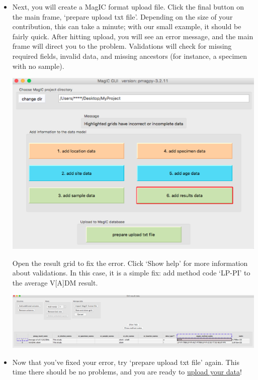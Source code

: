 \documentclass[11pt]{book}
\begin{document}
{\begin{itemize}
  \item Next, you will create a MagIC format upload file.  Click the final button on the main frame, `prepare upload txt file'.  Depending on the size of your contribution, this can take a minute; with our small example, it should be fairly quick.  After hitting upload, you will see an error message, and the main frame will direct you to the problem.  Validations will check for missing required fields, invalid data, and missing ancestors (for instance, a specimen with no sample).

    \includegraphics[width=25cm]{EPSfiles/MM_validation_mainframe.eps}

    Open the result grid to fix the error.  Click `Show help' for more information about validations.  In this case, it is a simple fix: add method code `LP-PI' to the average V[A]DM result.

    \includegraphics[width=45cm]{EPSfiles/MM_filled_in_result_validation.eps}

  \item Now that you've fixed your error, try `prepare upload txt file' again.  This time there should be no problems, and you are ready to \href{#magic_upload}{upload your data}!

\end{itemize}




}
\end{document}
